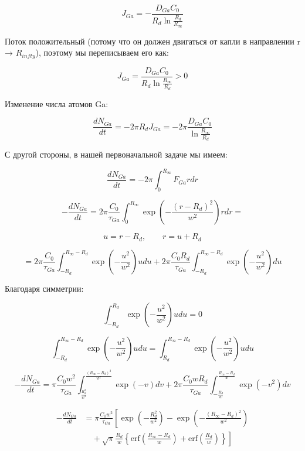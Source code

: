 \documentclass[14pt,oneside]{extarticle}
\begin{document}
\[
J_{Ga}=-\frac{D_{Ga}C_{0}}{R_{d}\ln\frac{R_{d}}{R_{\infty}}}
\]

Поток положительный (потому что он должен двигаться от капли в направлении r → $R_{infty}$), поэтому мы переписываем его как:

\begin{equation}
J_{Ga}=\frac{D_{Ga}C_{0}}{R_{d}\ln\frac{R_{\infty}}{R_{d}}}>0
\end{equation}

Изменение числа атомов Ga:

\begin{equation}
\frac{dN_{Ga}}{dt}=-2\pi R_{d}J_{Ga}=-2\pi\frac{D_{Ga}C_{0}}{\ln\frac{R_{\infty}}{R_{d}}}
\end{equation}

С другой стороны, в нашей первоначальной задаче мы имеем:

\begin{equation}
\frac{dN_{Ga}}{dt}=-2\pi\int_{0}^{R_{\infty}}F_{Ga}rdr
\end{equation}

\[
-\frac{dN_{Ga}}{dt}=2\pi\frac{C_{0}}{\tau_{Ga}}\int_{0}^{R_{\infty}}\exp\left(-\frac{\left(r-R_{d}\right)^{2}}{w^{2}}\right)rdr=
\]

\[
u=r-R_{d},\qquad r=u+R_{d}
\]

\begin{equation}
=2\pi\frac{C_{0}}{\tau_{Ga}}\int_{-R_{d}}^{R_{\infty}-R_{d}}\exp\left(-\frac{u^{2}}{w^{2}}\right)udu+2\pi\frac{C_{0}R_{d}}{\tau_{Ga}}\int_{-R_{d}}^{R_{\infty}-R_{d}}\exp\left(-\frac{u^{2}}{w^{2}}\right)du
\end{equation}

Благодаря симметрии:

\[
\int_{-R_{d}}^{R_{d}}\exp\left(-\frac{u^{2}}{w^{2}}\right)udu=0
\]

\[
\int_{-R_{d}}^{R_{\infty}-R_{d}}\exp\left(-\frac{u^{2}}{w^{2}}\right)udu=\int_{R_{d}}^{R_{\infty}-R_{d}}\exp\left(-\frac{u^{2}}{w^{2}}\right)udu
\]

\[
-\frac{dN_{Ga}}{dt}=\pi\frac{C_{0}w^{2}}{\tau_{Ga}}\int_{\frac{R_{d}^{2}}{w^{2}}}^{\frac{\left(R_{\infty}-R_{d}\right)^{2}}{w^{2}}}\exp\left(-v\right)dv+2\pi\frac{C_{0}wR_{d}}{\tau_{Ga}}\int_{-\frac{R_{d}}{w}}^{\frac{R_{\infty}-R_{d}}{w}}\exp\left(-v^{2}\right)dv
\]

\begin{equation}
    \begin{split}
    -\frac{dN_{Ga}}{dt} &= \pi \frac{C_{0} w^{2}}{\tau_{Ga}} \left[
    \exp\left(-\frac{R_{d}^{2}}{w^{2}}\right)
    - \exp\left(-\frac{(R_{\infty} - R_{d})^{2}}{w^{2}}\right) \right. \\
    &\quad + \left. \sqrt{\pi} \frac{R_{d}}{w}
    \left\{ \text{erf}\left(\frac{R_{\infty} - R_{d}}{w}\right)
    + \text{erf}\left(\frac{R_{d}}{w}\right) \right\}
    \right]
    \end{split}
\end{equation}
    
\end{document}

